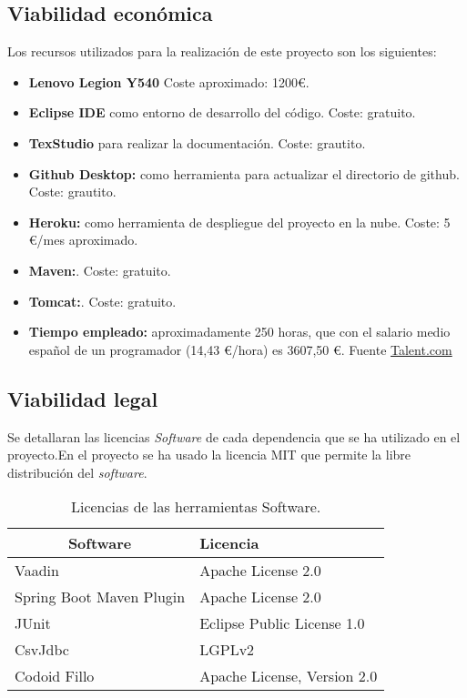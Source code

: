 \subsection{Viabilidad económica}
Los recursos utilizados para la realización de este proyecto son los siguientes:
\begin{itemize}
	\item  \textbf{Lenovo Legion Y540} Coste aproximado: 1200€.
	\item  \textbf{Eclipse IDE} como entorno de desarrollo del código. Coste: gratuito.
	\item  \textbf{TexStudio} para realizar la documentación. Coste: grautito.
	\item  \textbf{Github Desktop:} como herramienta para actualizar el directorio de github. Coste: grautito.
	\item \textbf{Heroku:} como herramienta de despliegue del proyecto en la nube. Coste: 5 €/mes aproximado.
	\item \textbf{Maven:}. Coste: gratuito.
	\item \textbf{Tomcat:}. Coste: gratuito.
	\item \textbf{Tiempo empleado:} aproximadamente 250 horas, que con el salario medio español de un programador (14,43 €/hora) es 3607,50 €. Fuente \href{https://es.talent.com/salary?job=programador#:~:text=%C2%BFCu%C3%A1nto%20gana%20un%20Programador%20en,hasta%20%E2%82%AC%2037.500%20al%20a%C3%B1o.}{Talent.com}
\end{itemize}

\subsection{Viabilidad legal}
Se detallaran las licencias \emph{Software} de cada dependencia que se ha utilizado en el proyecto.En el proyecto se ha usado la licencia MIT que permite la libre distribución del \emph{software}.

\begin{table}[]
	\label{Dependencias del proyecto}
	\centering
	\begin{tabular}{|l|l|}
		\hline
		\multicolumn{1}{|c|}{\textbf{Software}}     & \textbf{Licencia} \\ \hline
		Vaadin & Apache License 2.0 \\ \hline
		Spring Boot Maven Plugin & Apache License 2.0 \\ \hline
		JUnit & Eclipse Public License 1.0 \\	\hline
		CsvJdbc & LGPLv2 \\ \hline
		Codoid Fillo & Apache License, Version 2.0 \\ \hline
	\end{tabular}
	\caption{Licencias de las herramientas Software.}
\end{table}

